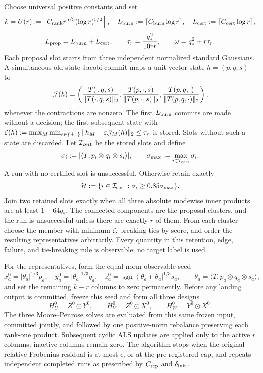 Choose universal positive constants and set
\[
 k=U(r):=\left\lceil C_{\rm rank}r^{5/3}(\log r)^{5/2}\right\rceil,
 \quad L_{\rm burn}:=\lceil C_{\rm burn}\log r\rceil,
 \quad L_{\rm cert}:=\lceil C_{\rm cert}\log r\rceil,
\]
\[
 L_{\rm prop}=L_{\rm burn}+L_{\rm cert},\qquad
 \tau_r={q_*^2\over10^4r},\qquad \omega=q_*^2+r\tau_r.
\]
Each proposal slot starts from three independent normalized standard
Gaussians. A simultaneous old-state Jacobi commit maps a unit-vector state
$h=(p,q,s)$ to
\[
 {\cal J}(h)=\left({T(\cdot,q,s)\over\|T(\cdot,q,s)\|_2},
 {T(p,\cdot,s)\over\|T(p,\cdot,s)\|_2},
 {T(p,q,\cdot)\over\|T(p,q,\cdot)\|_2}\right),
\]
whenever the contractions are nonzero. The first $L_{\rm burn}$ commits are
made without a decision; the first subsequent state with
$\zeta(h):=\max_M\min_{\varepsilon\in\{\pm1\}}
\|h_M-\varepsilon{\cal J}_M(h)\|_2\le\tau_r$ is stored. Slots without
such a state are discarded. Let ${\cal I}_{\rm cert}$ be the stored slots and
define
\[
 \sigma_i:=|\langle T,p_i\otimes q_i\otimes s_i\rangle|,
 \qquad \sigma_{\max}:=\max_{i\in{\cal I}_{\rm cert}}\sigma_i.
\]
A run with no certified slot is unsuccessful. Otherwise retain exactly
\[
 {\cal H}:=\{i\in{\cal I}_{\rm cert}:\sigma_i\ge0.85\sigma_{\max}\}.
\]
Join two retained slots exactly when all three absolute modewise inner
products are at least $1-64q_*$. The connected components are the proposal
clusters, and the run is unsuccessful unless there are exactly $r$ of them.
From each cluster choose the member with minimum $\zeta$, breaking ties by
score, and order the resulting representatives arbitrarily. Every quantity in
this retention, edge, failure, and tie-breaking rule is observable; no target
label is used.

For the representatives, form the equal-norm observable seed
\[
 x_a^0=|\theta_a|^{1/3}p_a,\quad y_a^0=|\theta_a|^{1/3}q_a,\quad
 z_a^0=\operatorname{sgn}(\theta_a)|\theta_a|^{1/3}s_a,
 \qquad \theta_a=\langle T,p_a\otimes q_a\otimes s_a\rangle,
\]
and set the remaining $k-r$ columns to zero permanently. Before any
landing output is committed, freeze this seed and form all three designs
\[
 H_U^0=Z^0\odot Y^0,\qquad H_V^0=Z^0\odot X^0,\qquad
 H_W^0=Y^0\odot X^0.
\]
The three Moore--Penrose solves are evaluated from this same frozen input,
committed jointly, and followed by one positive-norm rebalance preserving
each rank-one product. Subsequent cyclic ALS updates are applied only to the
active $r$ columns; inactive columns remain zero. The algorithm stops when
the original relative Frobenius residual is at most $\epsilon$, or at the
pre-registered cap, and repeats independent completed runs as prescribed by
$C_{\rm rep}$ and $\delta_{\rm init}$.

